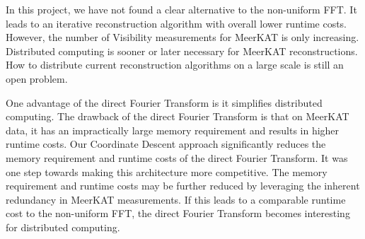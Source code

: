 In this project, we have not found a clear alternative to the non-uniform FFT. It leads to an iterative reconstruction algorithm with overall lower runtime costs. However, the number of Visibility measurements for MeerKAT is only increasing. Distributed computing is sooner or later necessary for MeerKAT reconstructions. How to distribute current reconstruction algorithms on a large scale is still an open problem.

One advantage of the direct Fourier Transform is it simplifies distributed computing. The drawback of the direct Fourier Transform is that on MeerKAT data, it has an impractically large memory requirement and results in higher runtime costs. Our Coordinate Descent approach significantly reduces the memory requirement and runtime costs of the direct Fourier Transform. It was one step towards making this architecture more competitive. The memory requirement and runtime costs may be further reduced by leveraging the inherent redundancy in MeerKAT measurements. If this leads to a comparable runtime cost to the non-uniform FFT, the direct Fourier Transform becomes interesting for distributed computing.










